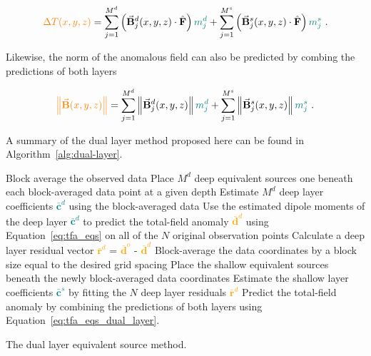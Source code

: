 \begin{equation}
    \label{eq:tfa_eqs_dual_layer}
  \textcolor{orange}{\Delta T (x, y, z)} = \sum_{j=1}^{M^d} \left(\vec{\mathbf{B}}^d_j(x, y, z) \cdot \hat{\mathbf{F}}\right) \textcolor{teal}{m_j^d}
  +  \sum_{j=1}^{M^s} \left(\vec{\mathbf{B}}^s_j(x, y, z) \cdot \hat{\mathbf{F}}\right) \textcolor{teal}{m_j^s}
  \ .
\end{equation}

\noindent
Likewise, the norm of the anomalous field can also be predicted by combing the predictions of both layers

\begin{equation}
  \textcolor{orange}{\left\lVert \vec{\mathbf{B}}(x,y,z) \right\rVert} = 
  \sum_{j=1}^{M^d}  \left\lVert \vec{\mathbf{B}}^d_{j}(x,y,z) \right\rVert \textcolor{teal}{m^d_j}
  +
  \sum_{j=1}^{M^s}  \left\lVert \vec{\mathbf{B}}^s_{j}(x,y,z) \right\rVert \textcolor{teal}{m^s_j}
  \ .
\end{equation}

A summary of the dual layer method proposed here can be found in Algorithm~\ref{alg:dual-layer}.

\begin{algorithm}[!h]
  Block average the observed data
  \;
  Place $M^d$ deep equivalent sources one beneath each block-averaged data point at a given depth
  \;
  Estimate $M^d$ deep layer coefficients \textcolor{teal}{$\bar{\mathbf{c}}^d$} using the block-averaged data 
  \;
  Use the estimated dipole moments of the deep layer \textcolor{teal}{$\bar{\mathbf{c}}^d$} to predict the total-field anomaly \textcolor{orange}{$\bar{\mathbf{d}}^d$} using Equation~\ref{eq:tfa_eqs} on all of the $N$ original observation points
  \;
  Calculate a deep layer residual vector \textcolor{orange}{$\bar{\mathbf{r}}^d$} = \textcolor{orange}{$\bar{\mathbf{d}}^o$} - \textcolor{orange}{$\bar{\mathbf{d}}^d$}
  \;
  Block-average the data coordinates by a block size equal to the desired grid spacing
  \;
  Place the shallow equivalent sources beneath the newly block-averaged data coordinates
  \;
  Estimate the shallow layer coefficients \textcolor{teal}{$\bar{\mathbf{c}}^s$} by fitting the $N$ deep layer residuals \textcolor{orange}{$\bar{\mathbf{r}}^d$}
  \;
   Predict the total-field anomaly by combining the predictions of both layers using Equation~\ref{eq:tfa_eqs_dual_layer}.
  \BlankLine
  \caption{The dual layer equivalent source method.}
  \label{alg:dual-layer}
\end{algorithm}


